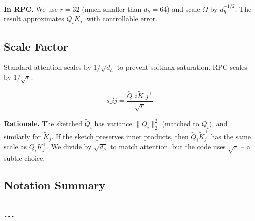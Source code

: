 \textbf{In RPC.} We use $r = 32$ (much smaller than $d_h = 64$) and scale 
$\Omega$ by $d_h^{-1/2}$. The result approximates $Q_i K_j^\top$ with 
controllable error.

\subsection{Scale Factor}

Standard attention scales by $1/\sqrt{d_h}$ to prevent softmax saturation. 
RPC scales by $1/\sqrt{r}$:

\[
s\_{ij} = \frac{\tilde{Q}\_i \tilde{K}\_j^\top}{\sqrt{r}}
\tag{3.6}
\]

\textbf{Rationale.} The sketched $\tilde{Q}_i$ has variance $\|Q_i\|_2^2$ 
(matched to $Q_i$), and similarly for $\tilde{K}_j$. If the sketch preserves 
inner products, then $\tilde{Q}_i \tilde{K}_j^\top$ has the same scale as 
$Q_i K_j^\top$. We divide by $\sqrt{d_h}$ to match attention, but the code 
uses $\sqrt{r}$ -- a subtle choice.

\subsection{Notation Summary}

\begin{lstlisting}

---
\end{lstlisting}
